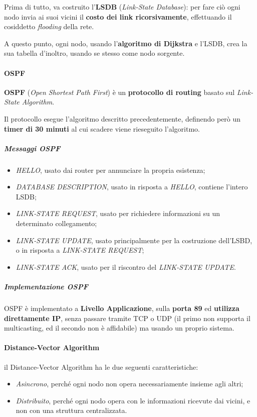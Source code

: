 \documentclass[a4paper]{article}
\begin{document}
				Prima di tutto, va costruito l'\textbf{LSDB} (\emph{Link-State Database}): per fare ciò ogni nodo invia ai suoi vicini il \textbf{costo dei link ricorsivamente}, effettuando il cosiddetto \emph{flooding} della rete.
				
				A questo punto, ogni nodo, usando l'\textbf{algoritmo di Dijkstra} e l'LSDB, crea la sua tabella d'inoltro, usando se stesso come nodo sorgente.
			
			\paragraph{OSPF}
				\textbf{OSPF} (\emph{Open Shortest Path First}) è un \textbf{protocollo di routing} basato sul \emph{Link-State Algorithm}.
				
				Il protocollo esegue l'algoritmo descritto precedentemente, definendo però un \textbf{timer di 30 minuti} al cui scadere viene rieseguito l'algoritmo.
				
				\newpage				
				
				\subparagraph{Messaggi OSPF}
					\begin{itemize}
						\item \emph{HELLO}, usato dai router per annunciare la propria esistenza;
						\item \emph{DATABASE DESCRIPTION}, usato in risposta a \emph{HELLO}, contiene l'intero LSDB;
						\item \emph{LINK-STATE REQUEST}, usato per richiedere informazioni su un determinato collegamento;
						\item \emph{LINK-STATE UPDATE}, usato principalmente per la costruzione dell'LSBD, o in risposta a \emph{LINK-STATE REQUEST};
						\item \emph{LINK-STATE ACK}, usato per il riscontro del \emph{LINK-STATE UPDATE}.
					\end{itemize}
				
				\subparagraph{Implementazione OSPF}
					OSPF è implementato a \textbf{Livello Applicazione}, sulla \textbf{porta 89} ed \textbf{utilizza direttamente IP}, senza passare tramite TCP o UDP (il primo non supporta il multicasting, ed il secondo non è affidabile) ma usando un proprio sistema.
				
			\paragraph{Distance-Vector Algorithm}
				il Distance-Vector Algorithm ha le due seguenti caratteristiche:
				\begin{itemize}
					\item \emph{Asincrono}, perché ogni nodo non opera necessariamente insieme agli altri;
					\item \emph{Distribuito}, perché ogni nodo opera con le informazioni ricevute dai vicini, e non con una struttura centralizzata.
				\end{itemize}
				
\end{document}
